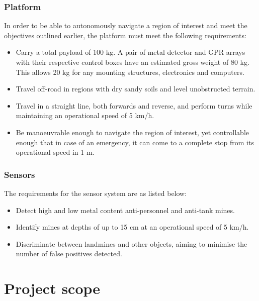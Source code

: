 \documentclass[main.tex]{subfiles}
\begin{document}
\subsubsection{Platform}
In order to be able to autonomously navigate a region of interest and meet the objectives outlined earlier, the platform must meet the following requirements: 
\begin{itemize}
 \item Carry a total payload of 100 kg. A pair of metal detector and GPR arrays with their respective control boxes have an estimated gross weight of 80 kg. This allows 20 kg for any mounting structures,  electronics and computers. 
 \item Travel off-road in regions with dry sandy soils and level unobstructed terrain.
\item Travel in a straight line, both forwards and reverse, and perform turns while maintaining an operational speed of 5 km/h.
\item Be manoeuvrable enough to navigate the region of interest, yet controllable enough that in case of an emergency, it can come to a complete stop from its operational speed in 1 m.
\end{itemize}

\subsubsection{Sensors}
The requirements for the sensor system are as listed below:
\begin{itemize}
\item Detect high and low metal content anti-personnel and anti-tank mines.
\item Identify mines at depths of up to 15 cm at an operational speed of 5 km/h.
\item Discriminate between landmines and other objects, aiming to minimise the number of false positives detected.
\end{itemize}

\section{Project scope}

\end{document}
